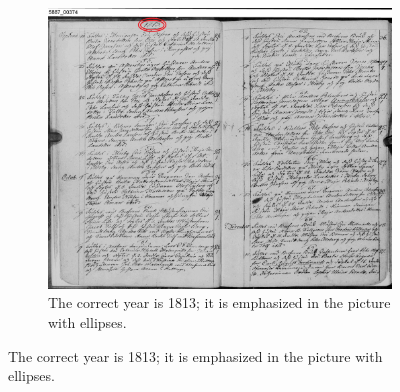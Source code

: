
\begin{figure}
    \centering
    \begin{subfigure}[c]{1.0\textwidth}
        \centering    \includegraphics[scale=0.56]{resources/SWE_attention/S3HT-64P3-T61.jpg}
        \caption{The correct year is 1813; it is emphasized in the picture with ellipses.}
    \end{subfigure}
    
    \vspace{1em}
    

\end{figure}
